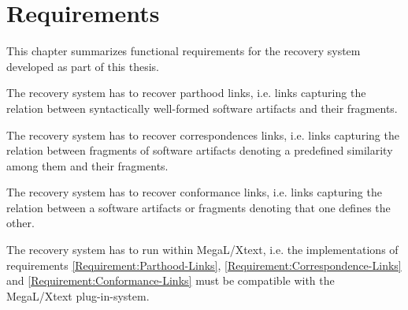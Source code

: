 \chapter{Requirements}
This chapter summarizes functional requirements for the recovery system developed as part of this thesis.

\begin{requirements}

\item
\label{Requirement:Parthood-Links}
The recovery system has to recover parthood links, i.e. links capturing the relation between syntactically well-formed software artifacts and their fragments.

\item
\label{Requirement:Correspondence-Links}
The recovery system has to recover correspondences links, i.e. links capturing the relation between fragments of software artifacts denoting a predefined similarity among them and their fragments.


\item
\label{Requirement:Conformance-Links} 
The recovery system has to recover conformance links, i.e. links capturing the relation between a software artifacts or fragments denoting that one defines the other.


\item 
\label{Requirement:Megal-Xtext}
The recovery system has to run within \gls{MegaL/Xtext}, i.e. the implementations of requirements \ref{Requirement:Parthood-Links}, \ref{Requirement:Correspondence-Links} and \ref{Requirement:Conformance-Links} must be compatible with the \gls{MegaL/Xtext} plug-in-system.

\end{requirements}
